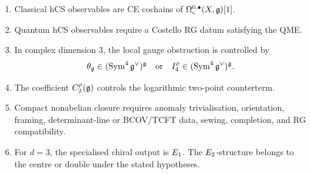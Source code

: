 \begin{enumerate}
\item Classical hCS observables are CE cochains of
\(\Omega^{0,\bullet}_c(X,\mathfrak{g})[1]\).
\item Quantum hCS observables require a Costello RG datum satisfying
the QME.
\item In complex dimension \(3\), the local gauge obstruction is
controlled by
\[
  \theta_{\mathfrak{g}}\in(\operatorname{Sym}^4\mathfrak{g}^\vee)^{\mathfrak{g}}
  \quad\hbox{or}\quad
  I_4^\rho\in(\operatorname{Sym}^4\mathfrak{g}^\vee)^{\mathfrak{g}} .
\]
\item The coefficient \(C_2^\rho(\mathfrak{g})\) controls the logarithmic
two-point counterterm.
\item Compact nonabelian closure requires anomaly trivialisation,
orientation, framing, determinant-line or BCOV/TCFT data, sewing,
completion, and RG compatibility.
\item For \(d=3\), the specialised chiral output is \(E_1\). The
\(E_2\)-structure belongs to the centre or double under the stated
hypotheses.
\end{enumerate}
